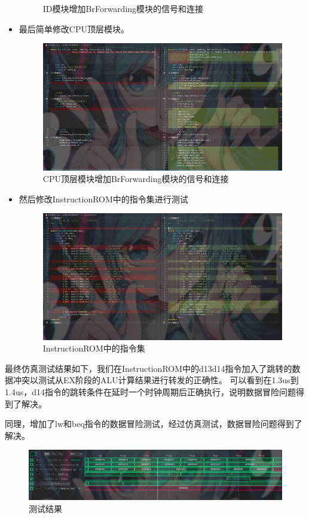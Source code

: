 \documentclass[12pt,hyperref,a4paper,UTF8]{ctexart}
\begin{document}
\begin{itemize}
\begin{figure}[H]
        \caption{ID模块增加BrForwarding模块的信号和连接}
    \end{figure}
    \item 最后简单修改CPU顶层模块。
    \begin{figure}[H]
        \centering
        \includegraphics[width=1\textwidth]{figures/fig/image27.png}
        \caption{CPU顶层模块增加BrForwarding模块的信号和连接}
    \end{figure}
    \item 然后修改InstructionROM中的指令集进行测试
    \begin{figure}[H]
        \centering
        \includegraphics[width=1\textwidth]{figures/fig/image28.png}
        \caption{InstructionROM中的指令集}
    \end{figure}

\end{itemize}

最终仿真测试结果如下，我们在InstructionROM中的d13d14指令加入了跳转的数据冲突以测试从EX阶段的ALU计算结果进行转发的正确性。
可以看到在1.3us到1.4us，d14指令的跳转条件在延时一个时钟周期后正确执行，说明数据冒险问题得到了解决。

同理，增加了lw和beq指令的数据冒险测试，经过仿真测试，数据冒险问题得到了解决。
    \begin{figure}[H]
        \centering
        \includegraphics[width=1\textwidth]{figures/fig/sim11.png}
        \caption{测试结果}
    \end{figure}
\end{document}
